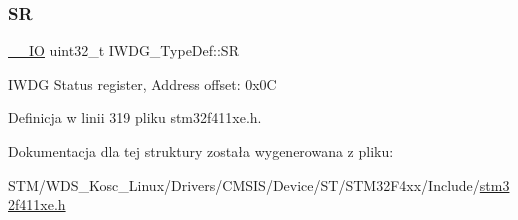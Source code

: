 \subsubsection{\texorpdfstring{SR}{SR}}
{\footnotesize\ttfamily \hyperlink{core__sc300_8h_aec43007d9998a0a0e01faede4133d6be}{\+\_\+\+\_\+\+IO} uint32\+\_\+t I\+W\+D\+G\+\_\+\+Type\+Def\+::\+SR}

I\+W\+DG Status register, Address offset\+: 0x0C 

Definicja w linii 319 pliku stm32f411xe.\+h.



Dokumentacja dla tej struktury została wygenerowana z pliku\+:\begin{DoxyCompactItemize}
\item 
S\+T\+M/\+W\+D\+S\+\_\+\+Kosc\+\_\+\+Linux/\+Drivers/\+C\+M\+S\+I\+S/\+Device/\+S\+T/\+S\+T\+M32\+F4xx/\+Include/\hyperlink{stm32f411xe_8h}{stm32f411xe.\+h}\end{DoxyCompactItemize}
